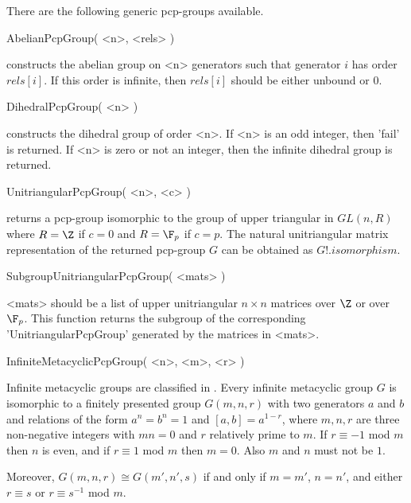 

There are the following generic pcp-groups available.

\>AbelianPcpGroup( <n>, <rels> )

      constructs the   abelian  group  on  <n>  generators  such  that
      generator $i$ has  order $rels[i]$. If  this  order is infinite,
      then $rels[i]$ should be either unbound or 0.

\>DihedralPcpGroup( <n> )

      constructs the dihedral  group of order <n>. If <n>  is an odd
      integer, then 'fail' is returned.  If  <n> is zero or not an 
      integer, then the infinite dihedral group is returned.

\>UnitriangularPcpGroup( <n>, <c> )

      returns a pcp-group isomorphic  to the group of upper triangular
      in $GL(n, R)$ where $R = \Z$ if $c = 0$ and $R = \F_p$ if $c = p$.
      The natural unitriangular matrix representation of the returned 
      pcp-group $G$ can be obtained as $G!.isomorphism$.

\>SubgroupUnitriangularPcpGroup( <mats> )

      <mats> should be a list of upper unitriangular $n \times n$ 
      matrices over $\Z$ or over $\F_p$. This function returns the 
      subgroup of the corresponding 'UnitriangularPcpGroup' generated 
      by the matrices in <mats>.

\>InfiniteMetacyclicPcpGroup( <n>, <m>, <r> )

      Infinite metacyclic groups are classified in \cite{BK00}. Every 
      infinite metacyclic group $G$ is isomorphic to a finitely presented 
      group $G(m,n,r)$ with two generators $a$ and $b$ and relations of the 
      form $a^n = b^n = 1$ and $[a,b] = a^{1-r}$, where $m,n,r$ are three
      non-negative integers with $mn=0$ and $r$ relatively prime to $m$. 
      If $r\equiv -1$ mod $m$ then $n$ is even, and if $r\equiv 1$ mod 
      $m$ then $m=0$. Also $m$ and $n$ must not be $1$.

      Moreover, $G(m,n,r)\cong G(m',n',s)$ if and only if $m=m'$, $n=n'$, 
      and either $r\equiv s$ or $r\equiv s^{-1}$ mod $m$. 


